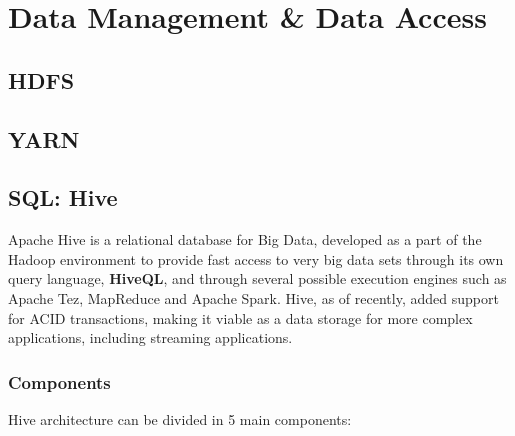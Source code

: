 \chapter{Data Management \& Data Access}

\section{HDFS}

\section{YARN}

\section{SQL: Hive}

Apache Hive is a relational database for Big Data, developed as a part of the Hadoop environment to provide fast access to very big data sets through its own query language, \textbf{HiveQL}, and through several possible execution engines such as Apache Tez, MapReduce and Apache Spark. Hive, as of recently, added  support for ACID transactions, making it viable as a data storage for more complex applications, including streaming applications.

\subsection{Components}

Hive architecture can be divided in 5 main components:

